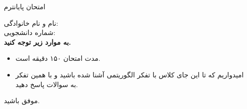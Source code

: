 
\usepackage{template/template}
\usepackage{tabularx}
\usepackage{graphicx}
\graphicspath{ {./images/} }


	\def\ci{\perp\!\!\!\perp}

	

	\header
		{امتحان پایانترم}{}{}{}{}
	


		نام و نام خانوادگی:\\
		شماره دانشجویی:\\
		\textbf{به موارد زیر توجه کنید.}
		
		\begin{itemize}
			\item مدت امتحان ۱۵۰ دقیقه است.
			\item امیدواریم که تا این جای کلاس با تفکر الگوریتمی آشنا شده باشید و با همین تفکر به سوالات پاسخ دهید.
		\end{itemize}
		
	\begin{enumerate}
		\setlength{\itemsep}{30pt}
		\pagebreak

		\end{enumerate}
	\begin{flushleft}
			موفق باشید. 
	\end{flushleft}

